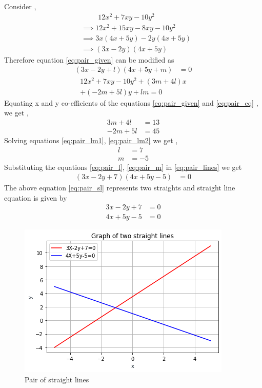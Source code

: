 \begin{enumerate}[label=\thesection.\arabic*.,ref=\thesection.\theenumi]
Consider , 
\begin{align}
    &\hspace{1cm}12x^2+7xy-10y^2\\
    &\implies 12x^2+15xy-8xy-10y^2\\
    &\implies 3x(4x+5y)-2y(4x+5y)\\
    &\implies (3x-2y)(4x+5y)
\end{align}
Therefore equation \eqref{eq:pair_given} can be modified as 
\begin{align}
(3x-2y+l)(4x+5y+m)&=0\label{eq:pair_lines}
\end{align}
\begin{multline}
12x^2 + 7xy -10y^2 + (3m+4l)x\\ 
+(-2m+5l)y+lm=0\label{eq:pair_eq}
\end{multline}
Equating x and y co-efficients of the equations \eqref{eq:pair_given} and \eqref{eq:pair_eq} , we get ,
\begin{align}
    3m+4l&=13\label{eq:pair_lm1}\\
    -2m+5l&=45\label{eq:pair_lm2}
\end{align}
Solving equations \eqref{eq:pair_lm1}, \eqref{eq:pair_lm2} we get ,
\begin{align}
        l&=7\label{eq:pair_l}\\
    m&=-5\label{eq:pair_m}
\end{align}
Substituting the equations \eqref{eq:pair_l}, \eqref{eq:pair_m} in \eqref{eq:pair_lines} we get
\begin{align}
    (3x-2y+7)(4x+5y-5)&=0\label{eq:pair_sl}
\end{align}
The above equation \eqref{eq:pair_sl} represents two straights and straight line equation is given by 
\begin{align}
    3x-2y+7&=0\label{eq:pair_line1}\\
    4x+5y-5&=0\label{eq:pair_line2}
\end{align}

\renewcommand{\thefigure}{1}
\begin{figure}[h]
    \centering
    \includegraphics[width=\columnwidth]{./figs/pair/pair_ang.png}
    \caption{Pair of straight lines}
    \label{fig:pair}
\end{figure}


\end{enumerate}
